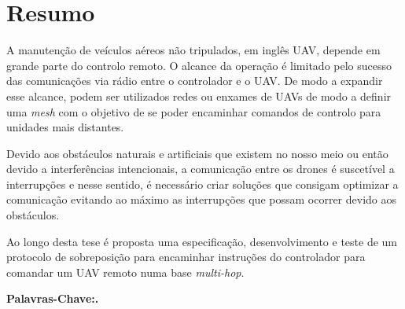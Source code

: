 \chapter*{Resumo}

A manutenção de veículos aéreos não tripulados, em inglês UAV, depende em grande parte do controlo remoto. O alcance da operação é limitado pelo sucesso das comunicações via rádio entre o controlador e o UAV. De modo a expandir esse alcance, podem ser utilizados redes ou enxames de UAVs de modo a definir uma \textit{mesh} com o objetivo de se poder encaminhar comandos de controlo para unidades mais distantes.

Devido aos obstáculos naturais e artificiais que existem no nosso meio ou então devido a interferências intencionais, a comunicação entre os drones é suscetível a interrupções e nesse sentido, é necessário criar soluções que consigam optimizar a comunicação evitando ao máximo as interrupções que possam ocorrer devido aos obstáculos.

Ao longo desta tese é proposta uma especificação, desenvolvimento e teste de um protocolo de sobreposição para encaminhar instruções do controlador para comandar um UAV remoto numa base \textit{multi-hop}.\newline 

\noindent\textbf{Palavras-Chave:. }%
\makeatletter
\@keywordsPT
\makeatother